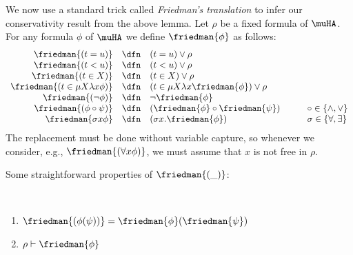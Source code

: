 We now use a standard trick called \emph{Friedman's translation} to infer our conservativity result from the above lemma. Let $\rho$ be a fixed formula of $\muHA$. For any formula $\phi$ of $\muHA$ we define $\friedman{\phi}$ as follows:
\[
\begin{array}{rcll}
    \friedman{(t=u)}  &  \dfn  & (t=u) \vee \rho\\
    \friedman{(t<u)}  &  \dfn  & (t<u) \vee \rho\\
    \friedman{(t \in X)}  &  \dfn  & (t \in X) \vee \rho\\
    \friedman{(t \in \mu X \lambda x\phi)}  &  \dfn  & (t \in \mu X\lambda x\friedman{\phi}) \vee \rho\\
   \friedman{(\neg \phi)}  & \dfn & \neg \friedman{\phi}\\
    \friedman{( \phi \circ \psi)}  & \dfn & ( \friedman{\phi}\circ \friedman{\psi})& \qquad \circ \in \{\wedge, \vee\}\\
    \friedman{\sigma x\phi} &\dfn & (\sigma x. \friedman{\phi}) &\qquad \sigma \in \{\forall, \exists\}
 \end{array}
\]
 The replacement must be done without variable capture, so whenever we consider, e.g., $\friedman{(\forall x \phi)}$, we must assume that $x$ is not free in $\rho$. 

Some straightforward properties of $\friedman{(\_)}$:
 \begin{lemma}{\ }\label{lem:friedman}
 \begin{enumerate}
     \item \label{lem:friedman1} $ \friedman{(\phi(\psi))}=\friedman{\phi}(\friedman{\psi})$
     \item \label{lem:friedman2}$\rho \vdash \friedman{\phi}$
 \end{enumerate}
 \end{lemma}

